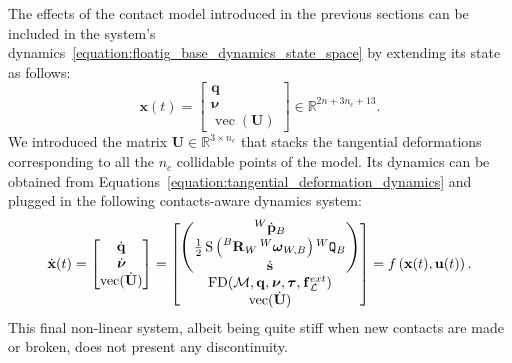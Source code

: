 The effects of the contact model introduced in the previous sections can be included in the system's dynamics~\eqref{equation:floatig_base_dynamics_state_space} by extending its state as follows:
%
\begin{equation*}
    \mathbf{x}(t) =
    \begin{bmatrix}
        \mathbf{q} \\ \boldsymbol{\nu} \\ \operatorname{vec}(\mathbf{U})
    \end{bmatrix}
    \in \mathbb{R}^{2n+3n_c+13}
    .
\end{equation*}
%
We introduced the matrix $\mathbf{U} \in \mathbb{R}^{3 \times n_c}$ that stacks the tangential deformations corresponding to all the $n_c$ collidable points of the model.
Its dynamics can be obtained from Equations~\eqref{equation:tangential_deformation_dynamics} and plugged in the following contacts-aware dynamics system:
%
\begin{equation}
\label{equation:floatig_base_dynamics_with_contacts_state_space}
    \dot{\mathbf{x}}(t) =
    \begin{bmatrix}
        \Qud \\ \Nud \\ \operatorname{vec}(\dot{\mathbf{U}})
    \end{bmatrix} =
    \begin{bmatrix}
        \begin{pmatrix}
            \posd[W]_B \\
            \frac{1}{2} \operatorname{S}\left( \rot[B]_W \velang[W]_{W,B} \right) \quat[W]_B \\
            \dot{\mathbf{s}}
        \end{pmatrix} \\
        \operatorname{FD}(\mathcal{M}, \Qu, \Nu, \Torques, \forcesix_\mathcal{L}^{ext}) \\
        \operatorname{vec}(\dot{\mathbf{U}})
    \end{bmatrix} =
    f\left(\mathbf{x}(t), \mathbf{u}(t)\right)
    .
\end{equation}
%
This final non-linear system, albeit being quite stiff when new contacts are made or broken, does not present any discontinuity.

